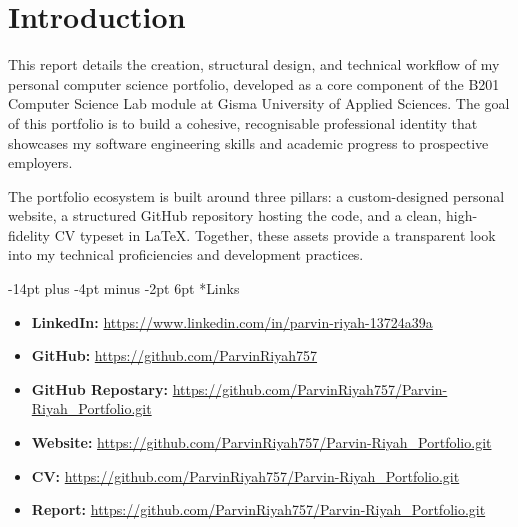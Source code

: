 \documentclass[12pt, a4paper]{report}
\makeatletter
\renewcommand\section{%
  \@startsection{section}{1}{\z@}%
    {-14pt plus -4pt minus -2pt}%
    {6pt}%
    {\normalfont\fontsize{14}{18}\bfseries\color{midPurple}}%
}
\makeatother
\begin{document}
\tableofcontents
\clearpage

\setcounter{page}{1}
\renewcommand{\chaptername}{}

\chapter{Introduction}

This report details the creation, structural design, and technical workflow
of my personal computer science portfolio, developed as a core component of
the B201 Computer Science Lab module at Gisma University of Applied Sciences.
The goal of this portfolio is to build a cohesive, recognisable professional
identity that showcases my software engineering skills and academic progress
to prospective employers.

The portfolio ecosystem is built around three pillars: a custom-designed
personal website, a structured GitHub repository hosting the code, and a
clean, high-fidelity CV typeset in LaTeX. Together, these assets provide
a transparent look into my technical proficiencies and development practices.

\section*{Links}

\begin{itemize}
  \item \textbf{LinkedIn:}\enspace
        \href{https://www.linkedin.com/in/parvin-riyah-13724a39a}%
             {https://www.linkedin.com/in/parvin-riyah-13724a39a}
  \item \textbf{GitHub:}\enspace
        \href{https://github.com/ParvinRiyah757}%
             {https://github.com/ParvinRiyah757}
    \item \textbf{GitHub Repostary:}\enspace
        \href{https://github.com/ParvinRiyah757/Parvin-Riyah_Portfolio.git}%
             {https://github.com/ParvinRiyah757/Parvin-Riyah_Portfolio.git}
  \item \textbf{Website:}\enspace
        \href{https://github.com/ParvinRiyah757/Parvin-Riyah_Portfolio.git}%
             {https://github.com/ParvinRiyah757/Parvin-Riyah_Portfolio.git}
  \item \textbf{CV:}\enspace
        \href{https://github.com/ParvinRiyah757/Parvin-Riyah_Portfolio.git}%
             {https://github.com/ParvinRiyah757/Parvin-Riyah_Portfolio.git}
  \item \textbf{Report:}\enspace
        \href{https://github.com/ParvinRiyah757/Parvin-Riyah_Portfolio.git}%
             {https://github.com/ParvinRiyah757/Parvin-Riyah_Portfolio.git}
\end{itemize}
\end{document}
